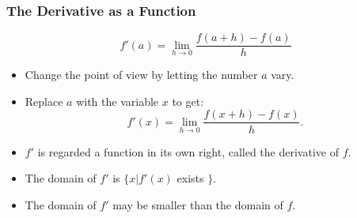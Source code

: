 \begin{frame}
\frametitle{The Derivative as a Function}
\[
f'(a) = \lim_{h\rightarrow 0}\frac{f(a+h)-f(a)}{h}
\]
\begin{itemize}
\item<2-> Change the point of view by  letting the number $a$ vary.
\item<3-> Replace $a$ with the variable $x$ to get:
\[
f'(x) = \lim_{h\rightarrow 0}\frac{f(x+h)-f(x)}{h}.
\]
\item<4-> $f'$ is regarded a function in its own right, called the derivative of $f$.
\item<5-> The domain of $f'$ is $\{ x | f'(x)$ exists $\}$.  
\item<6-> The domain of $f'$ may be smaller than the domain of $f$.
\end{itemize}
\end{frame}
